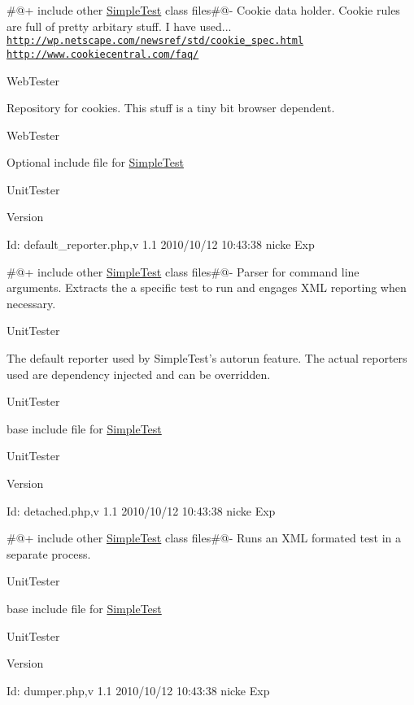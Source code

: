 \#@+ include other \hyperlink{class_simple_test}{SimpleTest} class files\#@-\/ Cookie data holder. Cookie rules are full of pretty arbitary stuff. I have used... \href{http://wp.netscape.com/newsref/std/cookie_spec.html}{\tt http://wp.netscape.com/newsref/std/cookie\_\-spec.html} \href{http://www.cookiecentral.com/faq/}{\tt http://www.cookiecentral.com/faq/}

WebTester

Repository for cookies. This stuff is a tiny bit browser dependent.

WebTester

Optional include file for \hyperlink{class_simple_test}{SimpleTest}

UnitTester \begin{DoxyVersion}{Version}

\end{DoxyVersion}
\begin{DoxyParagraph}{Id:}
default\_\-reporter.php,v 1.1 2010/10/12 10:43:38 nicke Exp 
\end{DoxyParagraph}


\#@+ include other \hyperlink{class_simple_test}{SimpleTest} class files\#@-\/ Parser for command line arguments. Extracts the a specific test to run and engages XML reporting when necessary.

UnitTester

The default reporter used by SimpleTest's autorun feature. The actual reporters used are dependency injected and can be overridden.

UnitTester

base include file for \hyperlink{class_simple_test}{SimpleTest}

UnitTester \begin{DoxyVersion}{Version}

\end{DoxyVersion}
\begin{DoxyParagraph}{Id:}
detached.php,v 1.1 2010/10/12 10:43:38 nicke Exp 
\end{DoxyParagraph}


\#@+ include other \hyperlink{class_simple_test}{SimpleTest} class files\#@-\/ Runs an XML formated test in a separate process.

UnitTester

base include file for \hyperlink{class_simple_test}{SimpleTest}

UnitTester \begin{DoxyVersion}{Version}

\end{DoxyVersion}
\begin{DoxyParagraph}{Id:}
dumper.php,v 1.1 2010/10/12 10:43:38 nicke Exp 
\end{DoxyParagraph}


